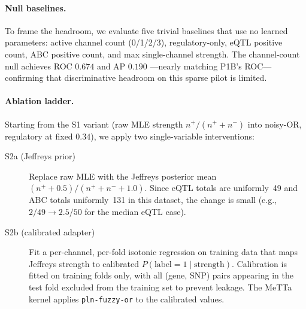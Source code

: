 \documentclass[]{article}
\newcommand{\code}[1]{\texttt{#1}}
\begin{document}
\paragraph{Null baselines.}
To frame the headroom, we evaluate five trivial baselines that use no
learned parameters: active channel count (0/1/2/3), regulatory-only,
eQTL positive count, ABC positive count, and max single-channel
strength.  The channel-count null achieves ROC $0.674$ and AP $0.190$
---nearly matching P1B's ROC---confirming that discriminative headroom
on this sparse pilot is limited.

\paragraph{Ablation ladder.}
Starting from the S1 variant (raw MLE strength $n^{+}/(n^{+}+n^{-})$
into noisy-OR, regulatory at fixed $0.34$), we apply two
single-variable interventions:
\begin{description}
\item[S2a (Jeffreys prior)] Replace raw MLE with the Jeffreys posterior
  mean $(n^{+}+0.5)/(n^{+}+n^{-}+1.0)$.  Since eQTL totals are
  uniformly~49 and ABC totals uniformly~131 in this dataset, the
  change is small (e.g., $2/49 \to 2.5/50$ for the median eQTL case).
\item[S2b (calibrated adapter)] Fit a per-channel, per-fold
  isotonic regression on training data that maps Jeffreys strength to
  calibrated $P(\mathrm{label} = 1 \mid \mathrm{strength})$.
  Calibration is fitted on training folds only, with all
  (gene, SNP) pairs appearing in the test fold excluded from the
  training set to prevent leakage.  The MeTTa kernel applies
  \code{pln-fuzzy-or} to the calibrated values.
\end{description}
\end{document}
